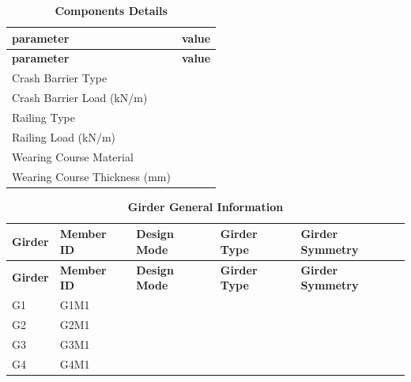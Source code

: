 \documentclass[12pt,a4paper]{report}
\numberwithin{table}{chapter}
\numberwithin{figure}{chapter}
\newcommand{\ReportTableGap}{\vspace{1em}}
\newcommand{\ReportMinorGap}{\vspace{0.4em}}
\begin{document}
\ReportTableGap

\begin{longtable}{|L{5.5cm}|p{10.0cm}|}
\caption{\textbf{Components Details}}\\
\hline
\textbf{parameter} & \textbf{value} \\
\hline
\endfirsthead
\hline
\textbf{parameter} & \textbf{value} \\
\hline
\endhead

\textnormal{Crash Barrier Type} &  \\[6pt]
\hline
\textnormal{Crash Barrier Load (kN/m)} &  \\[6pt]
\hline

\textnormal{Railing Type} &  \\[6pt]
\hline
\textnormal{Railing Load (kN/m)} &  \\[6pt]
\hline
\textnormal{Wearing Course Material} &  \\[6pt]
\hline
\textnormal{Wearing Course Thickness (mm)} &  \\[6pt]
\hline
\end{longtable}


\newpage

\ReportMinorGap
\noindent

\ReportMinorGap
\begin{longtable}{|L{2.2cm}|L{1.8cm}|p{3.8cm}|p{3.8cm}|p{3.8cm}|}
\caption{\textbf{Girder General Information}}\\
\hline
\textbf{Girder} & \textbf{Member ID} & \textbf{Design Mode} & \textbf{Girder Type} & \textbf{Girder Symmetry} \\[6pt]
\hline
\endfirsthead
\hline
\textbf{Girder} & \textbf{Member ID} & \textbf{Design Mode} & \textbf{Girder Type} & \textbf{Girder Symmetry} \\[6pt]
\hline
\endhead

G1 & G1M1 &  &  &  \\[8pt]
\hline
G2 & G2M1 &  &  &  \\[8pt]
\hline
G3 & G3M1 &  &  &  \\[8pt]
\hline
G4 & G4M1 &  &  &  \\[8pt]
\hline
\end{longtable}

\ReportMinorGap
\end{document}
